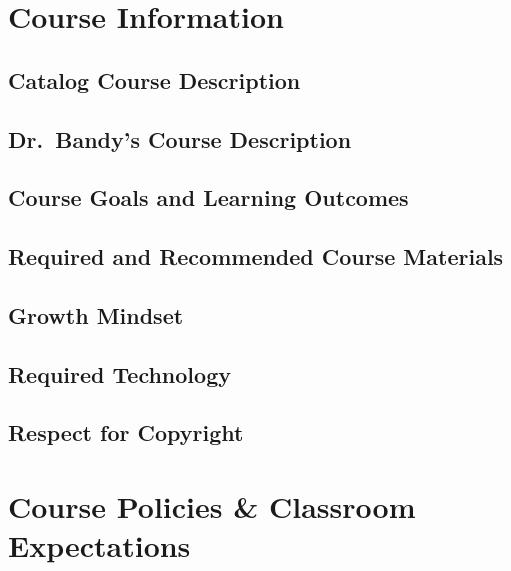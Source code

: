 \documentclass[11pt]{article}
\begin{document}

\section*{Course Information}

\subsection*{Catalog Course Description}


\subsection*{Dr.\ Bandy's Course Description}




\subsection*{Course Goals and Learning Outcomes}


\subsection*{Required and Recommended Course Materials}


\subsection*{Growth Mindset}


\subsection*{Required Technology}


\subsection*{Respect for Copyright}


\section*{Course Policies \& Classroom Expectations}
\end{document}
